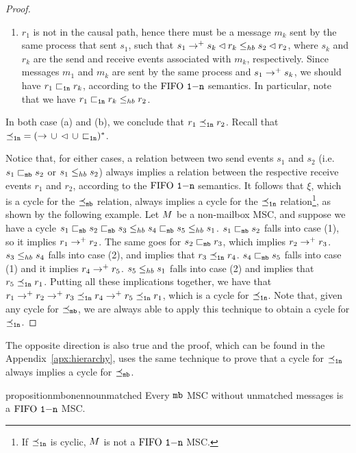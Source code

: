 \begin{proof}
\begin{enumerate}
\begin{enumerate}
		\item $r_1$ is not in the causal path, hence there must be a message $m_k$ sent by the same process that sent $s_1$, such that $s_1 \to^+ s_k \lhd r_k \leq_{hb} s_2 \lhd r_2$, where $s_k$ and $r_k$ are the send and receive events associated with $m_k$, respectively. Since messages $m_1$ and $m_k$ are sent by the same process and $s_1 \to^+ s_k$, we should have $r_1 \sqsubset_{\mathtt{1n}} r_k$, according to the $\text{FIFO } \mathtt{1\mathsf{-}n}$ semantics. In particular, note that we have $r_1 \sqsubset_{\mathtt{1n}} r_k \leq_{hb} r_2$.
	\end{enumerate}
	In both case (a) and (b), we conclude that $r_1 \preceq_{\mathtt{1n}} r_2$. Recall that ${\preceq_{\mathtt{1n}}} = ({\to} \,\cup\, {\lhd} \,\cup\, {\sqsubset_{\mathtt{1n}}})^\ast$.
\end{enumerate}
Notice that, for either cases, a relation between two send events $s_1$ and $s_2$ (i.e. $s_1 \sqsubset_{\mathtt{mb}} s_2$ or $s_1 \leq_{hb} s_2$) always implies a relation between the respective receive events $r_1$ and $r_2$, according to the $\text{FIFO } \mathtt{1\mathsf{-}n}$ semantics. It follows that $\xi$, which is a cycle for the $\preceq_{\mathtt{mb}}$ relation, always implies a cycle for the $\preceq_{\mathtt{1n}}$ relation\footnote{If $\preceq_{\mathtt{1n}}$ is cyclic, $M$ is not a $\text{FIFO } \mathtt{1\mathsf{-}n}$ MSC.}, as shown by the following example. Let $M$ be a non-mailbox MSC, and suppose we have a cycle $s_1 \sqsubset_{\mathtt{mb}} s_2 \sqsubset_{\mathtt{mb}} s_3 \leq_{hb} s_4 \sqsubset_{\mathtt{mb}} s_5 \leq_{hb} s_1$. $s_1 \sqsubset_{\mathtt{mb}} s_2$ falls into case (1), so it implies $r_1 \to^+ r_2$. The same goes for $s_2 \sqsubset_{\mathtt{mb}} r_3$, which implies $r_2 \to^+ r_3$. $s_3 \leq_{hb} s_4$ falls into case (2), and implies that $r_3 \preceq_{\mathtt{1n}} r_4$. $s_4 \sqsubset_{\mathtt{mb}} s_5$ falls into case (1) and it implies $r_4 \to^+ r_5$. $s_5 \leq_{hb} s_1$ falls into case (2) and implies that $r_5 \preceq_{\mathtt{1n}} r_1$. Putting all these implications together, we have that $r_1 \to^+ r_2 \to^+ r_3 \preceq_{\mathtt{1n}} r_4 \to^+ r_5 \preceq_{\mathtt{1n}} r_1$, which is a cycle for $\preceq_{\mathtt{1n}}$. Note that, given any cycle for $\preceq_{\mathtt{mb}}$, we are always able to apply this technique to obtain a cycle for $\preceq_{\mathtt{1n}}$.
\end{proof}

The opposite direction is also true and the proof, which can be found in the Appendix~\ref{apx:hierarchy}, uses the same technique to prove that a cycle for $\preceq_{\mathtt{1n}}$ always implies a cycle for $\preceq_{\mathtt{mb}}$.

\begin{restatable}{proposition}{mbonennounmatched} 
\label{prop:mb_onen_no_unmatched}
	Every $\mathtt{mb}$ MSC without unmatched messages is a $\text{FIFO } \mathtt{1\mathsf{-}n}$ MSC.
\end{restatable}

